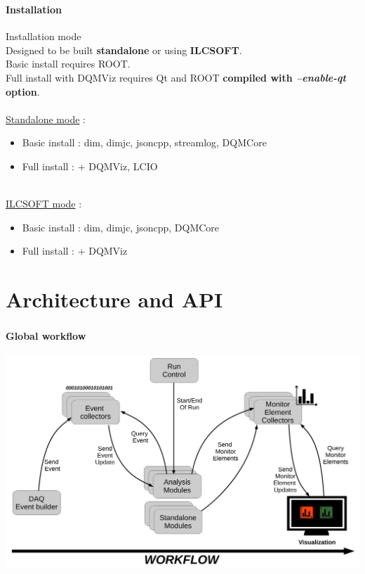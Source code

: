 \documentclass[8pt]{beamer}
\begin{document}
  
  \begin{frame}
    \frametitle{\secname}
    \framesubtitle{Installation}
    
    \begin{block}{Installation mode}
      ~ \\
      Designed to be built \textbf{standalone} or using \textbf{ILCSOFT}. \\
      Basic install requires ROOT. \\
      Full install with DQMViz requires Qt and ROOT \textbf{compiled with \textit{--enable-qt} option}. \\
      ~ \\
      \underline{Standalone mode} :
      \begin{itemize}
        \item Basic install : dim, dimjc, jsoncpp, streamlog, DQMCore
        \item Full install : + DQMViz, LCIO
      \end{itemize}
      ~ \\
      \underline{ILCSOFT mode} :
      \begin{itemize}
        \item Basic install : dim, dimjc, jsoncpp, DQMCore
        \item Full install : + DQMViz
      \end{itemize}
    \end{block}
  \end{frame}
  
  
  
  \section{Architecture and API}
  
  \begin{frame}
    \frametitle{\secname}
    \framesubtitle{Global workflow}
    
    \begin{center}
      \includegraphics[width=\textwidth]{figs/DQM4HEP_workflow.pdf}        
    \end{center}
  
  \end{frame}
  
\end{document}
